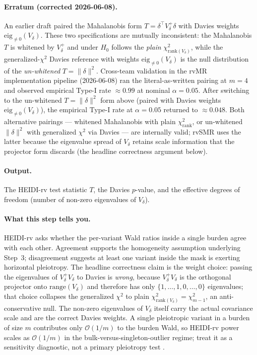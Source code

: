 \documentclass[11pt]{article}
\begin{document}
\paragraph{Erratum (corrected 2026-06-08).} An earlier draft paired the Mahalanobis form $T = \delta^\top V_\delta^{+}\delta$ with Davies weights $\mathrm{eig}_{\ne 0}(V_\delta)$. These two specifications are mutually inconsistent: the Mahalanobis $T$ is whitened by $V_\delta^{+}$ and under $H_0$ follows the \emph{plain} $\chi^2_{\mathrm{rank}(V_\delta)}$, while the generalized-$\chi^2$ Davies reference with weights $\mathrm{eig}_{\ne 0}(V_\delta)$ is the null distribution of the \emph{un-whitened} $T=\|\delta\|^2$. Cross-team validation in the rvMR implementation pipeline (2026-06-08) ran the literal-as-written pairing at $m=4$ and observed empirical Type-I rate $\approx 0.99$ at nominal $\alpha=0.05$. After switching to the un-whitened $T = \|\delta\|^2$ form above (paired with Davies weights $\mathrm{eig}_{\ne 0}(V_\delta)$), the empirical Type-I rate at $\alpha=0.05$ returned to $\approx 0.048$. Both alternative pairings --- whitened Mahalanobis with plain $\chi^2_{\mathrm{rank}}$, or un-whitened $\|\delta\|^2$ with generalized $\chi^2$ via Davies --- are internally valid; rvSMR uses the latter because the eigenvalue spread of $V_\delta$ retains scale information that the projector form discards (the headline correctness argument below).

\paragraph{Output.} The HEIDI-rv test statistic $T$, the Davies $p$-value, and the effective degrees of freedom (number of non-zero eigenvalues of $V_\delta$).

\paragraph{What this step tells you.} HEIDI-rv asks whether the per-variant Wald ratios inside a single burden agree with each other. Agreement supports the homogeneity assumption underlying Step~3; disagreement suggests at least one variant inside the mask is exerting horizontal pleiotropy. The headline correctness claim is the weight choice: passing the eigenvalues of $V_\delta^{+}V_\delta$ to Davies is \emph{wrong}, because $V_\delta^{+}V_\delta$ is the orthogonal projector onto $\mathrm{range}(V_\delta)$ and therefore has only $\{1,\dots,1,0,\dots,0\}$ eigenvalues; that choice collapses the generalized $\chi^2$ to plain $\chi^2_{\mathrm{rank}(V_\delta)}=\chi^2_{m-1}$, an anti-conservative null. The non-zero eigenvalues of $V_\delta$ itself carry the actual covariance scale and are the correct Davies weights. A single pleiotropic variant in a burden of size $m$ contributes only $\mathcal{O}(1/m)$ to the burden Wald, so HEIDI-rv power scales as $\mathcal{O}(1/m)$ in the bulk-versus-singleton-outlier regime; treat it as a sensitivity diagnostic, not a primary pleiotropy test \citep{Zhu2016}.
\end{document}
